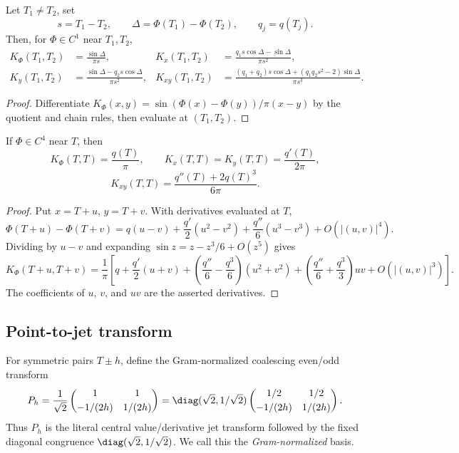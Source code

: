 \begin{lemma}
\label{lem:phase-kernel-derivatives}
Let \(T_1\ne T_2\), set
\[
        s=T_1-T_2,
        \qquad \Delta=\Phi(T_1)-\Phi(T_2),
        \qquad q_j=q(T_j).
\]
Then, for \(\Phi\in C^1\) near \(T_1,T_2\),
\begin{align*}
K_\Phi(T_1,T_2) &= \frac{\sin\Delta}{\pi s},
&K_x(T_1,T_2) &= \frac{q_1s\cos\Delta-\sin\Delta}{\pi s^2},\\
K_y(T_1,T_2) &= \frac{\sin\Delta-q_2s\cos\Delta}{\pi s^2},
&K_{xy}(T_1,T_2)
&=\frac{(q_1+q_2)s\cos\Delta+(q_1q_2s^2-2)\sin\Delta}{\pi s^3}.
\end{align*}
\end{lemma}

\begin{proof}
Differentiate
\(K_\Phi(x,y)=\sin(\Phi(x)-\Phi(y))/\pi(x-y)\) by the quotient and chain
rules, then evaluate at \((T_1,T_2)\).
\end{proof}

\begin{lemma}
\label{lem:phase-kernel-diagonal-derivatives}
If \(\Phi\in C^4\) near \(T\), then
\begin{equation}
\label{eq:diagonal-kernel-derivatives}
K_\Phi(T,T)=\frac{q(T)}{\pi},\qquad
K_x(T,T)=K_y(T,T)=\frac{q'(T)}{2\pi},
\end{equation}
\[
        K_{xy}(T,T)=\frac{q''(T)+2q(T)^3}{6\pi}.
\]
\end{lemma}

\begin{proof}
Put \(x=T+u\), \(y=T+v\).  With derivatives evaluated at \(T\),
\[
\Phi(T+u)-\Phi(T+v)
=q(u-v)+\frac{q'}{2}(u^2-v^2)+\frac{q''}{6}(u^3-v^3)+O(|(u,v)|^4).
\]
Dividing by \(u-v\) and expanding \(\sin z=z-z^3/6+O(z^5)\) gives
\[
K_\Phi(T+u,T+v)
=\frac1\pi\left[
 q+\frac{q'}2(u+v)
 +\left(\frac{q''}{6}-\frac{q^3}{6}\right)(u^2+v^2)
 +\left(\frac{q''}{6}+\frac{q^3}{3}\right)uv
 +O(|(u,v)|^3)\right].
\]
The coefficients of \(u\), \(v\), and \(uv\) are the asserted derivatives.
\end{proof}

\subsection{Point-to-jet transform}
\label{subsec:point-to-jet-transform}

For symmetric pairs \(T\pm h\), define the Gram-normalized coalescing
even/odd transform
\begin{equation}
\label{eq:point-to-jet-transform}
P_h
=\frac1{\sqrt2}
\begin{pmatrix}
1&1\\[0.6ex]
-1/(2h)&1/(2h)
\end{pmatrix}
=\diag(\sqrt2,1/\sqrt2)
\begin{pmatrix}
1/2&1/2\\[0.6ex]
-1/(2h)&1/(2h)
\end{pmatrix}.
\end{equation}
Thus \(P_h\) is the literal central value/derivative jet transform followed
by the fixed diagonal congruence \(\diag(\sqrt2,1/\sqrt2)\).  We call this the
\emph{Gram-normalized} basis.

